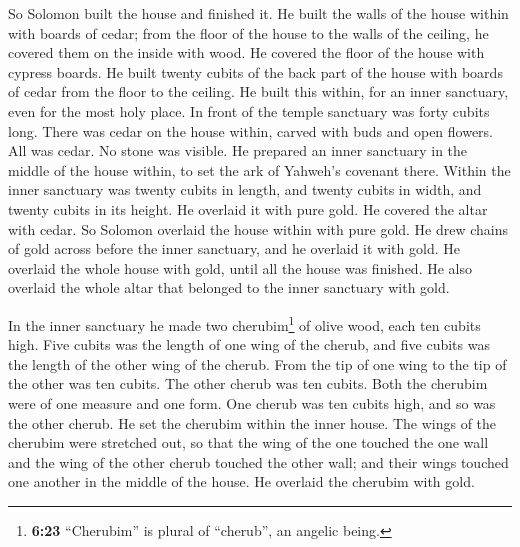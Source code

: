  So Solomon built the house and finished it.
 He built the walls of the house within with boards of
cedar; from the floor of the house to the walls of the ceiling, he
covered them on the inside with wood. He covered the floor of the house
with cypress boards.  He built twenty cubits of the back
part of the house with boards of cedar from the floor to the ceiling. He
built this within, for an inner sanctuary, even for the most holy place.
 In front of the temple sanctuary was forty cubits long.
 There was cedar on the house within, carved with buds
and open flowers. All was cedar. No stone was visible. 
He prepared an inner sanctuary in the middle of the house within, to set
the ark of Yahweh's covenant there.  Within the inner
sanctuary was twenty cubits in length, and twenty cubits in width, and
twenty cubits in its height. He overlaid it with pure gold. He covered
the altar with cedar.  So Solomon overlaid the house
within with pure gold. He drew chains of gold across before the inner
sanctuary, and he overlaid it with gold.  He overlaid the
whole house with gold, until all the house was finished. He also
overlaid the whole altar that belonged to the inner sanctuary with gold.

 In the inner sanctuary he made two cherubim\footnote{\textbf{6:23}
  ``Cherubim'' is plural of ``cherub'', an angelic being.} of olive
wood, each ten cubits high.  Five cubits was the length
of one wing of the cherub, and five cubits was the length of the other
wing of the cherub. From the tip of one wing to the tip of the other was
ten cubits.  The other cherub was ten cubits. Both the
cherubim were of one measure and one form.  One cherub
was ten cubits high, and so was the other cherub.  He set
the cherubim within the inner house. The wings of the cherubim were
stretched out, so that the wing of the one touched the one wall and the
wing of the other cherub touched the other wall; and their wings touched
one another in the middle of the house.  He overlaid the
cherubim with gold.


